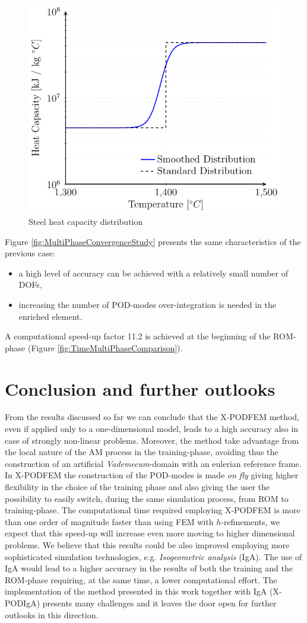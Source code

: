\documentclass[3p]{article}
\begin{document}
\begin{figure}[!h]
\centering
  \includegraphics[width=0.5\linewidth]{externals/Pictures/heatCapacity.pdf}
  \caption{Steel heat capacity distribution}
  \label{fig:heatCapacity}
\end{figure}

Figure \ref{fig:MultiPhaseConvergenceStudy} presents the same characteristics of the previous case: 
\begin{itemize}
\item a high level of accuracy can be achieved with a relatively small number of DOFs,
\item increasing the number of POD-modes over-integration is needed in the enriched element.
\end{itemize}
A computational speed-up factor 11.2 is achieved at the beginning of the ROM-phase (Figure \ref{fig:TimeMultiPhaseComparison}).


\section*{Conclusion and further outlooks}
From the results discussed so far we can conclude that the X-PODFEM method, even if applied only to a one-dimensional model, leads to a high accuracy also in case of strongly non-linear problems. Moreover, the method take advantage from the local nature of the AM process in the training-phase, avoiding thus the construction of an artificial \textit{Vademecum}-domain with an eulerian reference frame. In X-PODFEM the construction of the POD-modes is made \textit{on fly} giving higher flexibility in the choice of the training phase and also giving the user the possibility to easily switch, during the same simulation process, from ROM to training-phase.
The computational time required employing X-PODFEM is more than one order of magnitude faster than using FEM with $h$-refinements, we expect that this speed-up will increase even more moving to higher dimensional problems.
 We believe that this results could be also improved employing more sophisticated simulation technologies, e.g. \textit{Isogeometric analysis} (IgA). The use of IgA would lead to a higher accuracy in the results of both the training and the ROM-phase requiring, at the same time, a lower computational effort. The implementation of the method presented in this work together with IgA (X-PODIgA) presents many challenges and it leaves the door open for further outlooks in this direction.   



\end{document}
